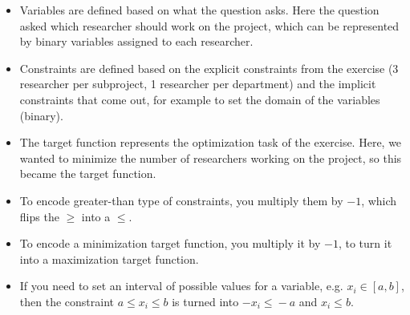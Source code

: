 \begin{itemize}
    \item Variables are defined based on what the question asks. Here the question asked which researcher should work on the project, which can be represented by binary variables assigned to each researcher.
    \item Constraints are defined based on the explicit constraints from the exercise (3 researcher per subproject, 1 researcher per department) and the implicit constraints that come out, for example to set the domain of the variables (binary).
    \item The target function represents the optimization task of the exercise. Here, we wanted to minimize the number of researchers working on the project, so this became the target function.
    \item To encode greater-than type of constraints, you multiply them by $-1$, which flips the $\geq{}$ into a $\leq{}$.
    \item To encode a minimization target function, you multiply it by $-1$, to turn it into a maximization target function.
    \item If you need to set an interval of possible values for a variable, e.g. $x_i \in{} [a,b]$, then the constraint $a\leq{}x_i\leq{}b$ is turned into $-x_i \leq{} -a$ and $x_i\leq{}b$.
\end{itemize}
